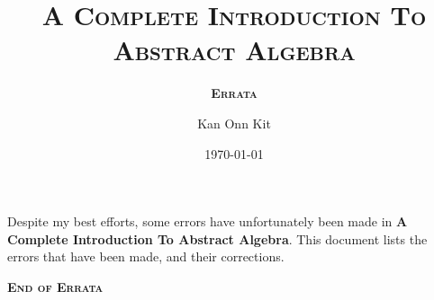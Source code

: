 \documentclass[
    a4paper,
    chapterprefix,
    DIV=9
]{scrartcl}
\title{\bfseries\scshape A Complete Introduction To\\Abstract Algebra}
\subtitle{\bfseries\scshape Errata}
\date{\today}
\author{Kan Onn Kit}
\begin{document}
\maketitle

Despite my best efforts, some errors have unfortunately been made in \textbf{A Complete Introduction To Abstract Algebra}. This document lists the errors that have been made, and their corrections.


\begin{center}
    \vfill
    {\Large\bfseries\scshape End of Errata}
\end{center}
\end{document}
